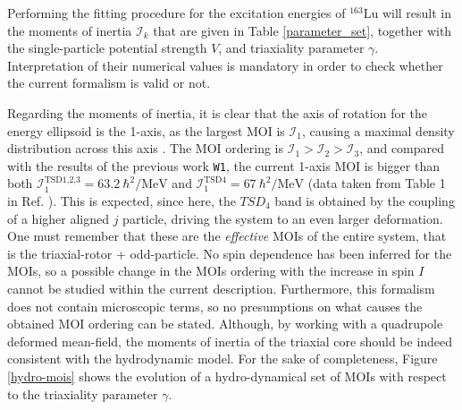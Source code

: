 \documentclass[myclassdoc,debug]{rjparticle}
\begin{document}
Performing the fitting procedure for the excitation energies of $^{163}$Lu will result in the moments of inertia $\mathcal{I}_k$ that are given in Table \ref{parameter_set}, together with the single-particle potential strength $V$, and triaxiality parameter $\gamma$. Interpretation of their numerical values is mandatory in order to check whether the current formalism is valid or not.

Regarding the moments of inertia, it is clear that the axis of rotation for the energy ellipsoid is the 1-axis, as the largest MOI is $\mathcal{I}_1$, causing a maximal density distribution across this axis \cite{frauendorf2014transverse}. The MOI ordering is $\mathcal{I}_1>\mathcal{I}_2>\mathcal{I}_3$, and compared with the results of the previous work \texttt{W1}, the current 1-axis MOI is bigger than both $\mathcal{I}_1^\text{TSD1,2,3}=63.2\ \hbar^2/\text{MeV}$ and $\mathcal{I}_1^\text{TSD4}=67\ \hbar^2/\text{MeV}$ (data taken from Table 1 in Ref. \cite{raduta2020towards}). This is expected, since here, the $TSD_4$ band is obtained by the coupling of a higher aligned $j$ particle, driving the system to an even larger deformation. One must remember that these are the \emph{effective} MOIs of the entire system, that is the triaxial-rotor + odd-particle. No spin dependence has been inferred for the MOIs, so a possible change in the MOIs ordering with the increase in spin $I$ cannot be studied within the current description. Furthermore, this formalism does not contain microscopic terms, so no presumptions on what causes the obtained MOI ordering can be stated. Although, by working with a quadrupole deformed mean-field, the moments of inertia of the triaxial core should be indeed consistent with the hydrodynamic model. For the sake of completeness, Figure \ref{hydro-mois} shows the evolution of a hydro-dynamical set of MOIs with respect to the triaxiality parameter $\gamma$.
\end{document}
